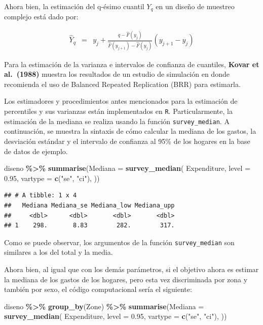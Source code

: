 \documentclass[
  12pt,
]{book}
\newenvironment{Shaded}{\begin{snugshade}}{\end{snugshade}}
\newcommand{\AttributeTok}[1]{\textcolor[rgb]{0.13,0.29,0.53}{#1}}
\newcommand{\FloatTok}[1]{\textcolor[rgb]{0.00,0.00,0.81}{#1}}
\newcommand{\FunctionTok}[1]{\textcolor[rgb]{0.13,0.29,0.53}{\textbf{#1}}}
\newcommand{\NormalTok}[1]{#1}
\newcommand{\SpecialCharTok}[1]{\textcolor[rgb]{0.81,0.36,0.00}{\textbf{#1}}}
\newcommand{\StringTok}[1]{\textcolor[rgb]{0.31,0.60,0.02}{#1}}
\begin{document}
Ahora bien, la estimación del q-ésimo cuantil \(Y_{q}\) en un diseño de muestreo complejo está dado por:

\begin{eqnarray*}
\hat{Y}_{q} & = & y_{j}+\frac{q-\hat{F}\left(y_{j}\right)}{\hat{F}\left(y_{j+1}\right)-\hat{F}\left(y_{j}\right)}\left(y_{j+1}-y_{j}\right)
\end{eqnarray*}

Para la estimación de la varianza e intervalos de confianza de cuantiles, \textbf{Kovar et al.~(1988)} muestra los resultados de un estudio de simulación en donde recomienda el uso de Balanced Repeated Replication (BRR) para estimarla.

Los estimadores y procedimientos antes mencionados para la estimación de percentiles y sus varianzas están implementados en \texttt{R}. Particularmente, la estimación de la mediana se realiza usando la función \texttt{survey\_median}. A continuación, se muestra la sintaxis de cómo calcular la mediana de los gastos, la desviación estándar y el intervalo de confianza al 95\% de los hogares en la base de datos de ejemplo.

\begin{Shaded}
\begin{Highlighting}[]
\NormalTok{diseno }\SpecialCharTok{\%\textgreater{}\%} \FunctionTok{summarise}\NormalTok{(}\AttributeTok{Mediana =}
  \FunctionTok{survey\_median}\NormalTok{(}
\NormalTok{    Expenditure,}
    \AttributeTok{level =} \FloatTok{0.95}\NormalTok{,}
    \AttributeTok{vartype =}  \FunctionTok{c}\NormalTok{(}\StringTok{"se"}\NormalTok{, }\StringTok{"ci"}\NormalTok{),}
\NormalTok{   ))}
\end{Highlighting}
\end{Shaded}

\begin{verbatim}
## # A tibble: 1 x 4
##   Mediana Mediana_se Mediana_low Mediana_upp
##     <dbl>      <dbl>       <dbl>       <dbl>
## 1    298.       8.83        282.        317.
\end{verbatim}

Como se puede observar, los argumentos de la función \texttt{survey\_median} son similares a los del total y la media.

Ahora bien, al igual que con los demás parámetros, si el objetivo ahora es estimar la mediana de los gastos de los hogares, pero esta vez discriminada por zona y también por sexo, el código computacional sería el siguiente:

\begin{Shaded}
\begin{Highlighting}[]
\NormalTok{diseno }\SpecialCharTok{\%\textgreater{}\%} \FunctionTok{group\_by}\NormalTok{(Zone) }\SpecialCharTok{\%\textgreater{}\%}
  \FunctionTok{summarise}\NormalTok{(}\AttributeTok{Mediana =}
  \FunctionTok{survey\_median}\NormalTok{(}
\NormalTok{    Expenditure,}
    \AttributeTok{level =} \FloatTok{0.95}\NormalTok{,}
    \AttributeTok{vartype =}  \FunctionTok{c}\NormalTok{(}\StringTok{"se"}\NormalTok{, }\StringTok{"ci"}\NormalTok{),}
\NormalTok{   ))}
\end{Highlighting}
\end{Shaded}
\end{document}
